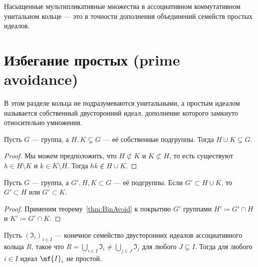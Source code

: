 \documentclass[
	extrafontsizes,
	11pt,
	hyphens,
]{memoir}
\begin{document}
\begin{observation}%
Насыщенные мультипликативные множества в ассоциативном коммутативном унитальном кольце --- это в точности дополнения объединений семейств простых идеалов.
\end{observation}


\section{\texorpdfstring{Избегание простых (\textenglish{prime avoidance})}{Избегание простых (prime avoidance)}}

\begin{convention}
В этом разделе кольца не подразумеваются унитальными, а простым идеалом называется собственный двусторонний идеал, дополнение которого замкнуто относительно умножения.
\end{convention}

\begin{theorem}
\label{thm:BinAvoid}
Пусть \(G\) --- группа, а \(H,K \varsubsetneq G\) --- её собственные подгруппы. Тогда \(H \cup K \varsubsetneq G\).
\end{theorem}

\begin{proof}
Мы можем предположить, что \(H \not\subset K\) и \(K \not\subset H\), то есть существуют \(h \in H \setminus K\) и \(k \in K \setminus H\). Тогда \(h k \notin H \cup K\).
\end{proof}

\begin{corollary}
Пусть \(G\) --- группа, а \(G',H,K \subset G\) --- её подгруппы. Если \(G' \subset H \cup K\), то \(G' \subset H\) или \(G' \subset K\).
\end{corollary}

\begin{proof}
Применим теорему~\ref{thm:BinAvoid} к покрытию \(G'\) группами \(H' \coloneqq G' \cap H\) и \(K' \coloneqq G' \cap K\).
\end{proof}

\begin{theorem}
\label{thm:PrAvoid}
Пусть \((\mathfrak{I}_i)_{i \in I}\) --- конечное семейство двусторонних идеалов ассоциативного кольца \(R\), такое что \(R = \bigcup_{i \in I} \mathfrak{I}_i \neq \bigcup_{j \in J} \mathfrak{I}_j\) для любого \(J \varsubsetneq I\). Тогда для любого \(i \in I\) идеал \(\mf{I}_i\) не простой.
\end{theorem}
\end{document}
